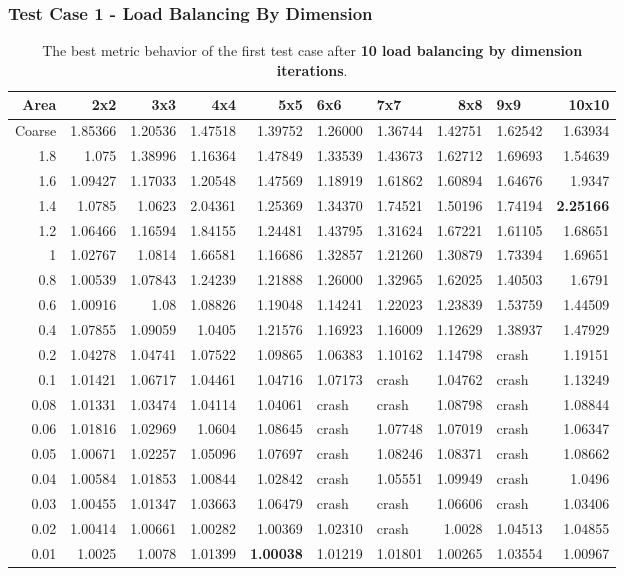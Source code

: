 \documentclass[compress]{beamer}
\begin{document}
\begin{frame}[t]\frametitle{Test Case 1 - Load Balancing By Dimension}
\begin{table}[H]
\tiny
\centering
\caption{The best metric behavior of the first test case after \textbf{10 load balancing by dimension iterations}.} 
 \begin{tabular}{rrrrrllrlr}
 \hline
  Area & 2x2 &3x3 & 4x4 & 5x5 & 6x6 & 7x7 &8x8 & 9x9 & 10x10 \\ 
\hline
 Coarse    & 1.85366 & 1.20536 & 1.47518 & 1.39752 & 1.26000 & 1.36744 & 1.42751 & 1.62542 & 1.63934 \\
  1.8  & 1.075   & 1.38996 & 1.16364 & 1.47849 & 1.33539 & 1.43673 & 1.62712 & 1.69693 & 1.54639 \\
  1.6  & 1.09427 & 1.17033 & 1.20548 & 1.47569 & 1.18919 & 1.61862 & 1.60894 & 1.64676 & 1.9347  \\
  1.4  & 1.0785  & 1.0623  & 2.04361 & 1.25369 & 1.34370 & 1.74521 & 1.50196 & 1.74194 & \textbf{\cellcolor{blue!25}2.25166} \\
  1.2  & 1.06466 & 1.16594 & 1.84155 & 1.24481 & 1.43795 & 1.31624 & 1.67221 & 1.61105 & 1.68651 \\
  1    & 1.02767 & 1.0814  & 1.66581 & 1.16686 & 1.32857 & 1.21260 & 1.30879 & 1.73394 & 1.69651 \\
  0.8  & 1.00539 & 1.07843 & 1.24239 & 1.21888 & 1.26000 & 1.32965 & 1.62025 & 1.40503 & 1.6791  \\
  0.6  & 1.00916 & 1.08    & 1.08826 & 1.19048 & 1.14241 & 1.22023 & 1.23839 & 1.53759 & 1.44509 \\
  0.4  & 1.07855 & 1.09059 & 1.0405  & 1.21576 & 1.16923 & 1.16009 & 1.12629 & 1.38937 & 1.47929 \\
  0.2  & 1.04278 & 1.04741 & 1.07522 & 1.09865 & 1.06383 & 1.10162 & 1.14798 & crash   & 1.19151 \\
  0.1  & 1.01421 & 1.06717 & 1.04461 & 1.04716 & 1.07173 & crash   & 1.04762 & crash   & 1.13249 \\
  0.08 & 1.01331 & 1.03474 & 1.04114 & 1.04061 & crash   & crash   & 1.08798 & crash   & 1.08844 \\
  0.06 & 1.01816 & 1.02969 & 1.0604  & 1.08645 & crash   & 1.07748 & 1.07019 & crash   & 1.06347 \\
  0.05 & 1.00671 & 1.02257 & 1.05096 & 1.07697 & crash   & 1.08246 & 1.08371 & crash   & 1.08662 \\
  0.04 & 1.00584 & 1.01853 & 1.00844 & 1.02842 & crash   & 1.05551 & 1.09949 & crash   & 1.0496  \\
  0.03 & 1.00455 & 1.01347 & 1.03663 & 1.06479 & crash   & crash   & 1.06606 & crash   & 1.03406 \\
  0.02 & 1.00414 & 1.00661 & 1.00282 & 1.00369 & 1.02310 & crash   & 1.0028  & 1.04513 & 1.04855 \\
  0.01 & 1.0025  & 1.0078  & 1.01399 & \textbf{\cellcolor{blue!25}1.00038} & 1.01219 & 1.01801 & 1.00265 & 1.03554 & 1.00967 \\
\hline
\end{tabular}
 \end{table}
\end{frame}
\end{document}
